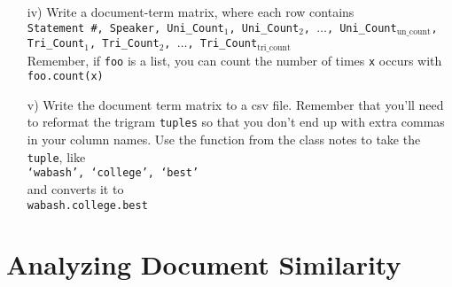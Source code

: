 \documentclass[12pt,letterpaper]{article}
\begin{document}
\begin{itemize}
\begin{itemize}
\item[iv)] Write a document-term matrix, where each row contains \\
{\tt Statement \#, Speaker, Uni\_Count$_1$, Uni\_Count$_2$, $\hdots$, Uni\_Count$_{\text{un\_count}}$, Tri\_Count$_1$, Tri\_Count$_2$, $\hdots$, Tri\_Count$_{{\text{tri\_count}}}$ }\\

Remember, if {\tt foo} is a list, you can count the number of times {\tt x} occurs with \\
{\tt foo.count(x)}

\item[v)] Write the document term matrix to a csv file.  Remember that you'll need to reformat the trigram {\tt tuples} so that you don't end up with extra commas in your column names. Use the function from the class notes to take the {\tt tuple}, like \\
{\tt `wabash', `college', `best'} \\
and converts it to\\
{\tt wabash.college.best}
\end{itemize}
\end{itemize}


\section*{Analyzing Document Similarity}
\end{document}
